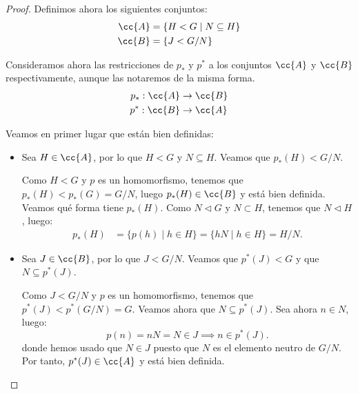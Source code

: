 \begin{ejercicio}
\begin{teo}
\begin{proof}
            Definimos ahora los siguientes conjuntos:
            \begin{align*}
                \cc{A} &= \{H<G \mid N\subseteq H\} \\
                \cc{B} &= \{J<G/N\}
            \end{align*}

            Consideramos ahora las restricciones de \(p_\ast\) y \(p^\ast\) a los conjuntos \(\cc{A}\) y \(\cc{B}\) respectivamente, aunque las notaremos de la misma forma.
            \begin{align*}
                p_\ast: \cc{A} &\to \cc{B} \\
                p^\ast: \cc{B} &\to \cc{A}
            \end{align*}

            Veamos en primer lugar que están bien definidas:
            \begin{itemize}
                \item Sea $H\in \cc{A}$, por lo que $H<G$ y $N\subseteq H$. Veamos que \(p_\ast(H)<G/N\).
                
                Como $H<G$ y $p$ es un homomorfismo, tenemos que \(p_\ast(H)<p_\ast(G) = G/N\), luego $p_\ast(H)\in \cc{B}$ y está bien definida.\\

                Veamos qué forma tiene \(p_\ast(H)\). Como $N\lhd G$ y $N\subset H$, tenemos que \(N\lhd H\), luego:
                \begin{align*}
                    p_\ast(H) &= \{p(h) \mid h \in H\} = \{hN \mid h \in H\} = H/N.
                \end{align*}

                \item Sea \(J\in \cc{B}\), por lo que \(J<G/N\). Veamos que \(p^\ast(J)<G\) y que \(N\subseteq p^\ast(J)\).
                
                Como \(J<G/N\) y \(p\) es un homomorfismo, tenemos que \(p^\ast(J)<p^\ast(G/N) = G\). Veamos ahora que \(N\subseteq p^\ast(J)\). Sea ahora $n\in N$, luego:
                \begin{equation*}
                    p(n) = nN = N \in J \implies n \in p^\ast(J).
                \end{equation*}
                donde hemos usado que \(N\in J\) puesto que $N$ es el elemento neutro de \(G/N\). Por tanto, \(p^\ast(J)\in \cc{A}\) y está bien definida.
            \end{itemize}


\end{proof}
\end{teo}
\end{ejercicio}

